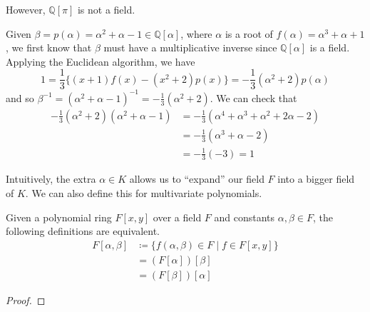   \begin{example}
    However, $\mathbb{Q}[\pi]$ is not a field. 
  \end{example} 

  \begin{example}
    Given $\beta = p(\alpha) = \alpha^2 + \alpha - 1 \in \mathbb{Q}[\alpha]$, where $\alpha$ is a root of $f(\alpha) = \alpha^3 + \alpha + 1$, we first know that $\beta$ must have a multiplicative inverse since $\mathbb{Q}[\alpha]$ is a field. Applying the Euclidean algorithm, we have 
    \begin{equation}
      1 = \frac{1}{3} \big\{ (x+1) f(x) - (x^2 + 2) p(x)\big\} = -\frac{1}{3} (\alpha^2 + 2) p(\alpha)
    \end{equation}
    and so $\beta^{-1} = (\alpha^2 + \alpha - 1)^{-1} = -\frac{1}{3} (\alpha^2 + 2)$. We can check that 
    \begin{align}
      -\frac{1}{3} (\alpha^2 + 2) (\alpha^2 + \alpha - 1) & = -\frac{1}{3} (\alpha^4 + \alpha^3 + \alpha^2 + 2 \alpha - 2) \\
                                                          & = -\frac{1}{3} (\alpha^3 + \alpha - 2) \\
                                                          & = -\frac{1}{3} (-3) = 1
    \end{align}
  \end{example}

  Intuitively, the extra $\alpha \in K$ allows us to ``expand'' our field $F$ into a bigger field of $K$. We can also define this for multivariate polynomials.  

  \begin{definition}
    Given a polynomial ring $F[x, y]$ over a field $F$ and constants $\alpha, \beta \in F$, the following definitions are equivalent. 
    \begin{align}
      F[\alpha, \beta] & \coloneqq \{ f(\alpha, \beta) \in F \mid f \in F[x, y] \} \\ 
                       & = (F[\alpha])[\beta] \\
                       & = (F[\beta])[\alpha]
    \end{align}
  \end{definition}
  \begin{proof}
    
  \end{proof} 
  
